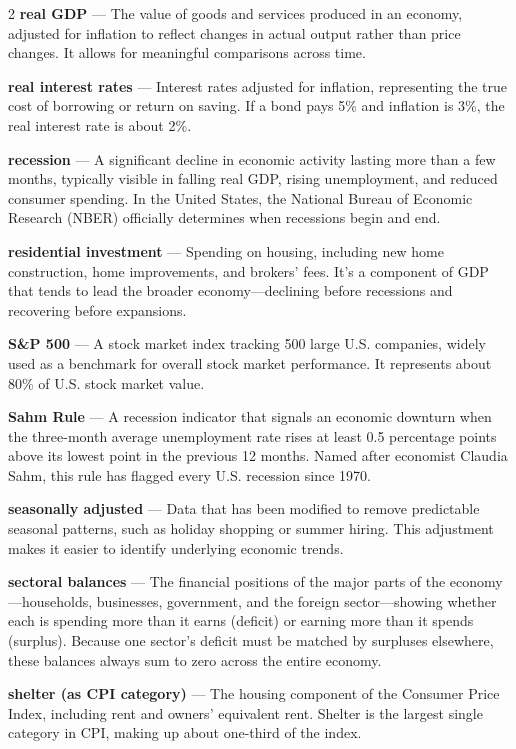 \begin{multicols}{2}
\textbf{real GDP} --- The value of goods and services produced in an economy, adjusted for inflation to reflect changes in actual output rather than price changes. It allows for meaningful comparisons across time.

\textbf{real interest rates} --- Interest rates adjusted for inflation, representing the true cost of borrowing or return on saving. If a bond pays 5\% and inflation is 3\%, the real interest rate is about 2\%.

\textbf{recession} --- A significant decline in economic activity lasting more than a few months, typically visible in falling real GDP, rising unemployment, and reduced consumer spending. In the United States, the National Bureau of Economic Research (NBER) officially determines when recessions begin and end.

\textbf{residential investment} --- Spending on housing, including new home construction, home improvements, and brokers' fees. It's a component of GDP that tends to lead the broader economy---declining before recessions and recovering before expansions.

\textbf{S\&P 500} --- A stock market index tracking 500 large U.S. companies, widely used as a benchmark for overall stock market performance. It represents about 80\% of U.S. stock market value.

\textbf{Sahm Rule} --- A recession indicator that signals an economic downturn when the three-month average unemployment rate rises at least 0.5 percentage points above its lowest point in the previous 12 months. Named after economist Claudia Sahm, this rule has flagged every U.S. recession since 1970.

\textbf{seasonally adjusted} --- Data that has been modified to remove predictable seasonal patterns, such as holiday shopping or summer hiring. This adjustment makes it easier to identify underlying economic trends.

\textbf{sectoral balances} --- The financial positions of the major parts of the economy---households, businesses, government, and the foreign sector---showing whether each is spending more than it earns (deficit) or earning more than it spends (surplus). Because one sector's deficit must be matched by surpluses elsewhere, these balances always sum to zero across the entire economy.

\textbf{shelter (as CPI category)} --- The housing component of the Consumer Price Index, including rent and owners' equivalent rent. Shelter is the largest single category in CPI, making up about one-third of the index.


\end{multicols}
